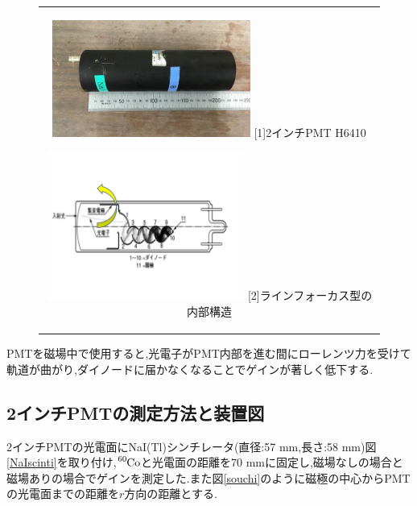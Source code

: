 \begin{figure}[h]
  \begin{center}
    \begin{tabular}{c}
      \begin{minipage}[t]{0.5\hsize}    
        \begin{center}
          \includegraphics[width=6.5cm]{fig/iguchi/PMTphoto.jpg}
	\hspace{1cm}[1]2インチPMT H6410
     \end{center}
    \end{minipage}
      \begin{minipage}[t]{0.5\hsize}    
        \begin{center}
          \includegraphics[width=6.5cm]{fig/iguchi/PMTinner.pdf}
         \hspace{2cm}[2]ラインフォーカス型の内部構造
         \end{center}
        \end{minipage}
     
     \end{tabular}
     \label{PMT12}
    \end{center}
 \end{figure}

PMTを磁場中で使用すると,光電子がPMT内部を進む間にローレンツ力を受けて軌道が曲がり,ダイノードに届かなくなることでゲインが著しく低下する.


\subsection{2インチPMTの測定方法と装置図}
2インチPMTの光電面にNaI(Tl)シンチレータ(直径:57 mm,長さ:58 mm)図\ref{NaIscinti}を取り付け,$\ce{^{60}Co}$と光電面の距離を70 mmに固定し,磁場なしの場合と磁場ありの場合でゲインを測定した.また図\ref{souchi}のように磁極の中心からPMTの光電面までの距離を$r$方向の距離とする.
 
